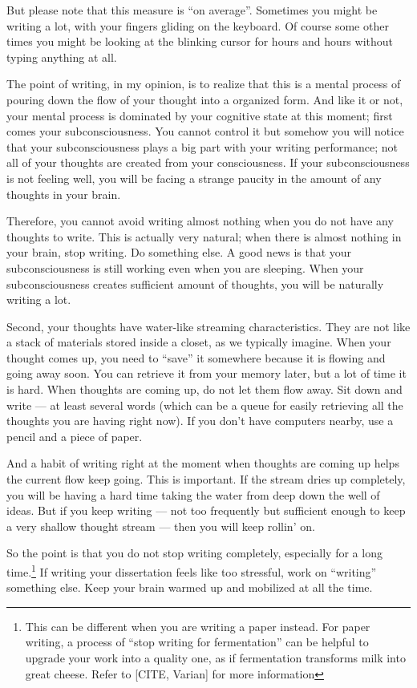 \documentclass[11pt]{article}
\begin{document}
But please note that this measure is ``on average''. Sometimes you
might be writing a lot, with your fingers gliding on the keyboard.
Of course some other times you might be looking at the blinking
cursor for hours and hours without typing anything at all. 

The point of writing, in my opinion, is to realize that this is a
mental process of pouring down the flow of your thought into a
organized form.  And like it or not, your mental process is
dominated by your cognitive state at this moment; first comes your
subconsciousness. You cannot control it but somehow you will
notice that your subconsciousness plays a big part with your
writing performance; not all of your thoughts are created from
your consciousness. If your subconsciousness is not feeling well,
you will be facing a strange paucity in the amount of any thoughts
in your brain.

Therefore, you cannot avoid writing almost nothing when you do not
have any thoughts to write. This is actually very natural; when
there is almost nothing in your brain, stop writing. Do something
else. A good news is that your subconsciousness is still working
even when you are sleeping.  When your subconsciousness creates
sufficient amount of thoughts, you will be naturally writing a
lot. 

Second, your thoughts have water-like streaming characteristics.
They are not like a stack of materials stored inside a closet, as
we typically imagine.  When your thought comes up, you need to
``save'' it somewhere because it is flowing and going away soon.
You can retrieve it from your memory later, but a lot of time it
is hard. When thoughts are coming up, do not let them flow away.
Sit down and write --- at least several words (which can be a
queue for easily retrieving all the thoughts you are having right
now). If you don't have computers nearby, use a pencil and a piece
of paper. 

And a habit of writing right at the moment when thoughts are
coming up helps the current flow keep going. This is important. If
the stream dries up completely, you will be having a hard time
taking the water from deep down the well of ideas.  But if you
keep writing --- not too frequently but sufficient enough to keep
a very shallow thought stream --- then you will keep rollin' on.

So the point is that you do not stop writing completely,
especially for a long time.\footnote{This can be different when
    you are writing a paper instead. For paper writing, a process
    of ``stop writing for fermentation'' can be helpful to upgrade
    your work into a quality one, as if fermentation transforms milk
into great cheese. Refer to [CITE, Varian] for more information}
If writing your dissertation feels like too stressful, work on
``writing'' something else. Keep your brain warmed up and
mobilized at all the time.
\end{document}
